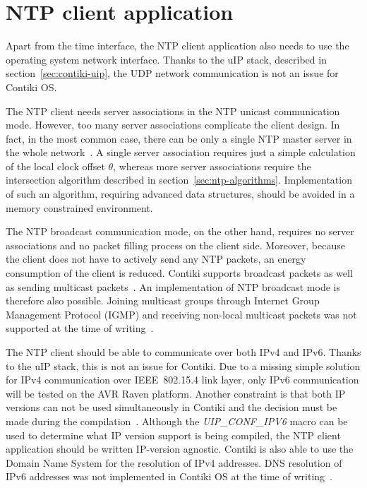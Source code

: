 
\section{NTP client application}\label{sec:analysis-application}
Apart from the time interface, the NTP client application
also needs to use the operating system network interface.
Thanks to the uIP stack, described in section~\ref{sec:contiki-uip},
the UDP network communication is not an issue for Contiki OS.

The NTP client needs server associations in the NTP unicast communication mode.
However, too many server associations complicate the client design.
In fact, in the most common case, there can be only a single NTP master server
in the whole network~\cite{rfc5905}.
A single server association requires just a simple calculation of the local clock offset
$\theta$, whereas more server associations require the intersection algorithm
described in section~\ref{sec:ntp-algorithms}.
Implementation of such an algorithm, requiring advanced data structures, should be avoided
in a memory constrained environment.

The NTP broadcast communication mode, on the other hand,
requires no server associations and no packet filling process on the client side.
Moreover, because the client does not have to actively send any NTP packets,
an energy consumption of the client is reduced.
Contiki supports broadcast packets as well as sending multicast packets~\cite{contiki-docs}.
An implementation of NTP broadcast mode is therefore also possible.
Joining multicast groups through Internet Group Management Protocol (IGMP)
and receiving non-local multicast packets
was not supported at the time of writing~\cite{contiki-docs}.

The NTP client should be able to communicate over both IPv4 and IPv6.
Thanks to the uIP stack, this is not an issue for Contiki.
Due to a missing simple solution for IPv4 communication over IEEE~802.15.4 link layer,
only IPv6 communication will be tested on the AVR Raven platform.
Another constraint is that both IP versions can not be used simultaneously in Contiki
and the decision must be made during the compilation~\cite{contiki-docs}.
Although the {\it{UIP\_CONF\_IPV6}} macro can be used to determine what IP version
support is being compiled, the NTP client application should be written IP-version agnostic.
Contiki is also able to use the Domain Name System for the resolution of IPv4 addresses.
DNS resolution of IPv6 addresses was not implemented in Contiki OS
at the time of writing~\cite{contiki-docs}.

